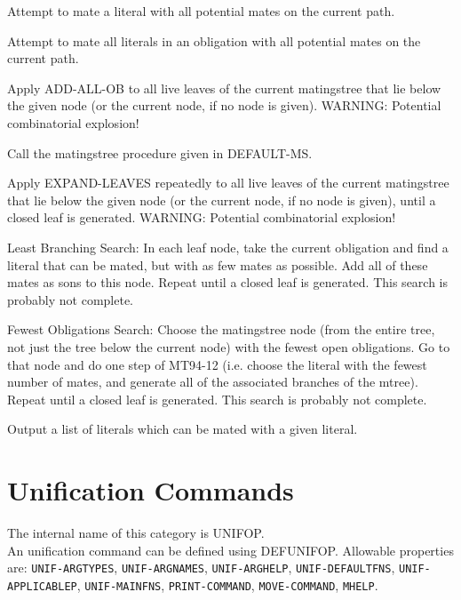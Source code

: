 \begin{description} 
\item[ADD-ALL-LIT]  
Attempt to mate a literal with all potential mates on 
the current path.

\item[ADD-ALL-OB]  
Attempt to mate all literals in an obligation 
with all potential mates on the current path.

\item[EXPAND-LEAVES]  
Apply ADD-ALL-OB to all live leaves of the current matingstree
that lie below the given node (or the current node, if no node is given).
WARNING: Potential combinatorial explosion!

\item[GO]  
Call the matingstree procedure given in DEFAULT-MS.

\item[MT94-11]  
Apply EXPAND-LEAVES repeatedly to all live leaves of the current 
matingstree that lie below the given node (or the current node, if 
no node is given), until a closed leaf is generated.
WARNING: Potential combinatorial explosion!

\item[MT94-12]  
Least Branching Search: In each leaf node, take the current
obligation and find a literal that can be mated, but with as few 
mates as possible. Add all of these mates as sons to this node.
Repeat until a closed leaf is generated.
This search is probably not complete.

\item[MT95-1]  
Fewest Obligations Search: Choose the matingstree node (from the 
entire tree, not just the tree below the current node) with the 
fewest open obligations. Go to that node and do one step of MT94-12
(i.e. choose the literal with the fewest number of mates, and generate
all of the associated branches of the mtree).
Repeat until a closed leaf is generated.
This search is probably not complete.

\item[QRY]  
Output a list of literals which can be mated with a given literal.
\item
\end{description}
\chapter{Unification Commands}
The internal name of this category is 
UNIFOP.\\
An unification command can be defined using DEFUNIFOP.
Allowable properties are: \texttt{UNIF-ARGTYPES}, \texttt{UNIF-ARGNAMES}, \texttt{UNIF-ARGHELP}, \texttt{UNIF-DEFAULTFNS}, \texttt{UNIF-APPLICABLEP}, \texttt{UNIF-MAINFNS}, \texttt{PRINT-COMMAND}, \texttt{MOVE-COMMAND}, \texttt{MHELP}.

